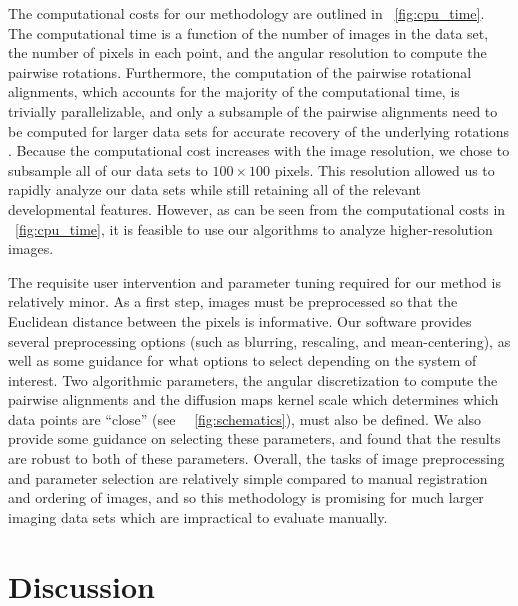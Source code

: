 The computational costs for our methodology are outlined in \fig~\ref{fig:cpu_time}.
%
The computational time is a function of the number of images in the data set, the number of pixels in each point, and the angular resolution to compute the pairwise rotations.
%
Furthermore, the computation of the pairwise rotational alignments, which accounts for the majority of the computational time, is trivially parallelizable, and only a subsample of the pairwise alignments need to be computed for larger data sets for accurate recovery of the underlying rotations \citep{singer2011angular}.
%
Because the computational cost increases with the image resolution, we chose to subsample all of our data sets to $100 \times 100$ pixels.
%
This resolution allowed us to rapidly analyze our data sets while still retaining all of the relevant developmental features.
%
However, as can be seen from the computational costs in \fig~\ref{fig:cpu_time}, it is feasible to use our algorithms to analyze higher-resolution images.

The requisite user intervention and parameter tuning required for our method is relatively minor.
%
As a first step, images must be preprocessed so that the Euclidean distance between the pixels is informative.
%
Our software provides several preprocessing options (such as blurring, rescaling, and mean-centering), as well as some guidance for what options to select depending on the system of interest.
%
Two algorithmic parameters, the angular discretization to compute the pairwise alignments and the diffusion maps kernel scale which determines which data points are ``close'' (see ~\fig~\ref{fig:schematics}), must also be defined.
%
We also provide some guidance on selecting these parameters, and found that the results are robust to both of these parameters.
%
Overall, the tasks of image preprocessing and parameter selection are relatively simple compared to manual registration and ordering of images, and so this methodology is promising for much larger imaging data sets which are impractical to evaluate manually.

\section{Discussion}

